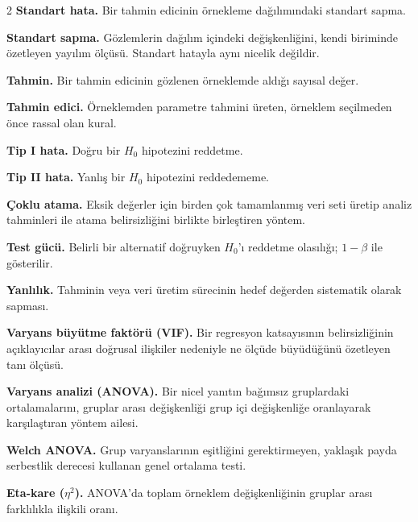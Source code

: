 \begin{multicols}{2}
\textbf{Standart hata.} Bir tahmin edicinin örnekleme dağılımındaki standart
sapma.\par\smallskip

\textbf{Standart sapma.} Gözlemlerin dağılım içindeki değişkenliğini, kendi
biriminde özetleyen yayılım ölçüsü. Standart hatayla aynı nicelik değildir.\par\smallskip

\textbf{Tahmin.} Bir tahmin edicinin gözlenen örneklemde aldığı sayısal değer.\par\smallskip

\textbf{Tahmin edici.} Örneklemden parametre tahmini üreten, örneklem
seçilmeden önce rassal olan kural.\par\smallskip

\textbf{Tip I hata.} Doğru bir $H_0$ hipotezini reddetme.\par\smallskip

\textbf{Tip II hata.} Yanlış bir $H_0$ hipotezini reddedememe.\par\smallskip

\textbf{Çoklu atama.} Eksik değerler için birden çok tamamlanmış veri seti
üretip analiz tahminleri ile atama belirsizliğini birlikte birleştiren yöntem.\par\smallskip

\textbf{Test gücü.} Belirli bir alternatif doğruyken $H_0$'ı reddetme
olasılığı; $1-\beta$ ile gösterilir.\par\smallskip

\textbf{Yanlılık.} Tahminin veya veri üretim sürecinin hedef değerden
sistematik olarak sapması.\par\smallskip

\ifimoders\else
\textbf{Varyans büyütme faktörü (VIF).} Bir regresyon katsayısının
belirsizliğinin açıklayıcılar arası doğrusal ilişkiler nedeniyle ne ölçüde
büyüdüğünü özetleyen tanı ölçüsü.\par\smallskip

\textbf{Varyans analizi (ANOVA).} Bir nicel yanıtın bağımsız gruplardaki
ortalamalarını, gruplar arası değişkenliği grup içi değişkenliğe oranlayarak
karşılaştıran yöntem ailesi.\par\smallskip

\textbf{Welch ANOVA.} Grup varyanslarının eşitliğini gerektirmeyen, yaklaşık
payda serbestlik derecesi kullanan genel ortalama testi.\par\smallskip

\textbf{Eta-kare ($\eta^2$).} ANOVA'da toplam örneklem değişkenliğinin
gruplar arası farklılıkla ilişkili oranı.\par\smallskip


\end{multicols}
